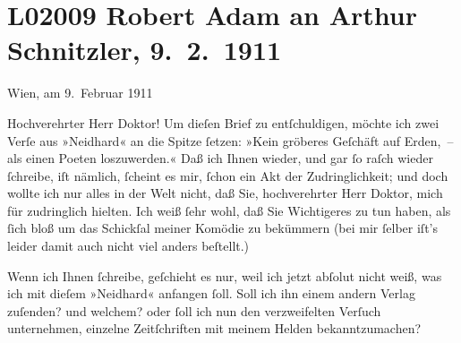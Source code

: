 

\section[Robert Adam an Arthur Schnitzler, 9. 2. 1911]{L02009 Robert Adam an Arthur Schnitzler, 9. 2. 1911}
\nopagebreak{}
\rehead{ }\normalsize\beginnumbering{}
\toendnotes[C]{\smallbreak\pagebreak[2]}
\toendnotes[C]{\smallbreak}
\pstart
           \raggedleft{}{\pb}Wien, am 9. Februar 1911\pend
           
\pstart{}Hochverehrter Herr Doktor!\pend\vspace{0.5em}
\pstart
           Um dieſen Brief zu entſchuldigen, möchte ich zwei Verſe aus »Neidhard« an die Spitze ſetzen: »Kein gröberes Geſchäft auf
               Erden, – als einen Poeten loszuwerden.« Daß ich Ihnen wieder, und gar ſo raſch wieder
               ſchreibe, iſt nämlich, ſcheint es mir, ſchon ein Akt der Zudringlichkeit; und doch
               wollte ich nur alles in der Welt nicht, daß Sie, hochverehrter Herr Doktor, mich für
               zudringlich hielten. Ich weiß ſehr wohl, daß Sie Wichtigeres zu tun haben, als ſich
               bloß um das Schickſal meiner Komödie zu beküm{\pb}mern (bei mir ſelber iſt’s
               leider damit auch nicht viel anders beſtellt.)\pend
           
\pstart
           Wenn ich Ihnen ſchreibe, geſchieht es nur, weil ich jetzt abſolut nicht weiß, was ich
               mit dieſem »Neidhard« anfangen ſoll. Soll ich
               ihn einem andern Verlag zuſenden? und welchem? oder ſoll ich nun den verzweifelten
               Verſuch unternehmen, einzelne Zeitſchriften mit meinem Helden bekanntzumachen?\pend
           
